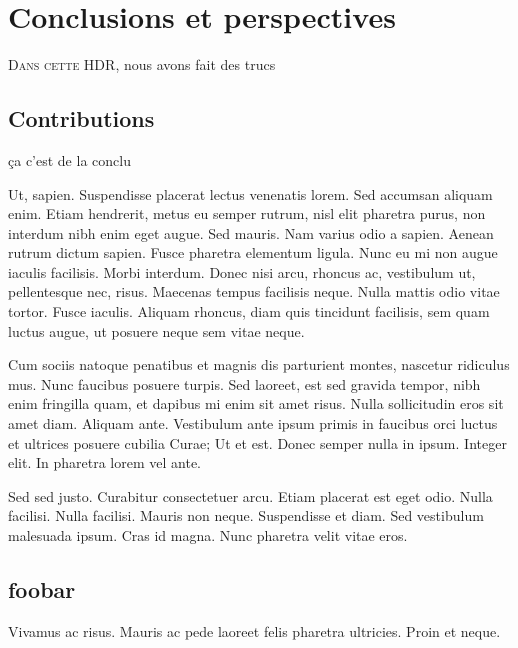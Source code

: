 \documentclass[../these.tex]{subfiles}
\begin{document}
\chapter{Conclusions et perspectives}
\label{chap:conclusion}

\ifSubfilesClassLoaded{%
  \tableofcontents
}{%
  \minitoc
}
\vskip2cm

\lettrine{D}{ans cette HDR}, nous avons fait des trucs

\section{Contributions}
ça c'est de la conclu

Ut, sapien. Suspendisse placerat lectus venenatis lorem. Sed accumsan aliquam
enim. Etiam hendrerit, metus eu semper rutrum, nisl elit pharetra purus, non
interdum nibh enim eget augue. Sed mauris. Nam varius odio a sapien. Aenean
rutrum dictum sapien. Fusce pharetra elementum ligula. Nunc eu mi non augue
iaculis facilisis. Morbi interdum. Donec nisi arcu, rhoncus ac, vestibulum
ut, pellentesque nec, risus. Maecenas tempus facilisis neque. Nulla mattis
odio vitae tortor. Fusce iaculis. Aliquam rhoncus, diam quis tincidunt
facilisis, sem quam luctus augue, ut posuere neque sem vitae neque.

Cum sociis natoque penatibus et magnis dis parturient montes, nascetur
ridiculus mus. Nunc faucibus posuere turpis. Sed laoreet, est sed gravida
tempor, nibh enim fringilla quam, et dapibus mi enim sit amet risus. Nulla
sollicitudin eros sit amet diam. Aliquam ante. Vestibulum ante ipsum primis
in faucibus orci luctus et ultrices posuere cubilia Curae; Ut et est. Donec
semper nulla in ipsum. Integer elit. In pharetra lorem vel ante.

Sed sed justo. Curabitur consectetuer arcu. Etiam placerat est eget odio.
Nulla facilisi. Nulla facilisi. Mauris non neque. Suspendisse et diam. Sed
vestibulum malesuada ipsum. Cras id magna. Nunc pharetra velit vitae eros.

\section{foobar }
Vivamus ac risus. Mauris ac pede laoreet felis pharetra ultricies. Proin et
neque. 

\end{document}
